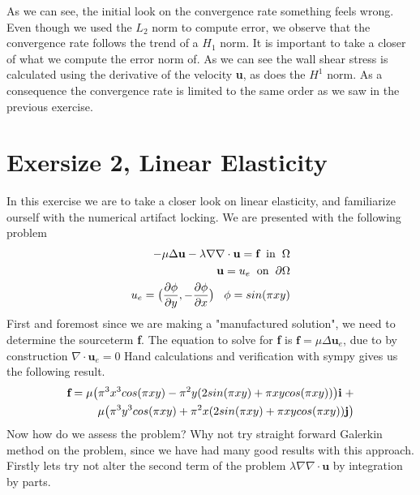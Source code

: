 \documentclass[a4paper,norsk]{article}
\begin{document}
As we can see, the initial look on the convergence rate something feels wrong. Even though we used the $L_2$ norm
to compute error, we observe that the convergence rate follows the trend of a $H_1$ norm. It is important to take a closer of what
we compute the error norm of. As we can see the wall shear stress is calculated using the derivative of the velocity \textbf{u}, as does the $H^1$ norm. As a consequence the convergence rate is limited to the same order as we saw in the previous exercise.
\section*{Exersize 2, Linear Elasticity}
In this exercise we are to take a closer look on linear elasticity, and familiarize ourself with
the numerical artifact locking. We are presented with the following problem
\begin{align*}
-\mu \Delta \textbf{u} - \lambda \nabla \nabla \cdot \textbf{u} = \textbf{f} \hspace{2mm} \text{in} \hspace{2mm} \Omega \\
\textbf{u} = u_e \hspace{2mm} \text{on} \hspace{2mm} \partial \Omega \\
u_e = \big(\frac{\partial \phi}{\partial y}, -\frac{\partial \phi}{\partial x} \big) \hspace{3mm}
\phi = sin(\pi x y)
\end{align*}
First and foremost since we are making a "manufactured solution", we need to determine the sourceterm \textbf{f}. The equation
to solve for \textbf{f} is $\textbf{f} =\mu  \Delta \textbf{u}_e$, due to by construction $\nabla \cdot \textbf{u}_e = 0$
 Hand calculations and verification with sympy gives us the following result.
\begin{align*}
\textbf{f} = \mu \big(\pi^3 x^3 cos(\pi x y) -\pi^2y (2sin(\pi x y) + \pi x y cos(\pi x y)   ) \big) \textbf{i} \hspace{1mm} + \\
\mu \big( \pi^3y^3 cos(\pi x y) + \pi^2 x (2 sin(\pi x y) + \pi x y cos(\pi x y)   ) \textbf{j} \big)
\end{align*}
Now how do we assess the problem? 
Why not try straight forward Galerkin method on the problem, since we have had many good results with this approach.
Firstly lets try not alter the second term of the problem $\lambda \nabla \nabla \cdot \textbf{u}$ by integration by parts. 
\end{document}
